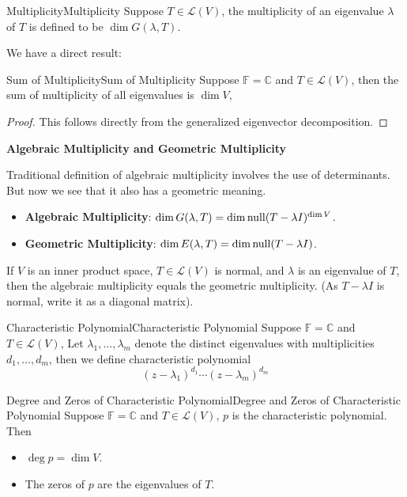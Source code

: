 \documentclass[../main.tex]{subfiles}
\begin{document}
\begin{definition}{Multiplicity}{Multiplicity}
Suppose $T\in \mathscr{L}(V)$, the multiplicity of an eigenvalue $\lambda$ of $T$ is defined to be $\dim G(\lambda,T)$.
\end{definition}

We have a direct result:
\begin{proposition}{Sum of Multiplicity}{Sum of Multiplicity}
Suppose $\mathbb{F}=\mathbb{C}$ and $T\in \mathscr{L}(V)$, then the sum of multiplicity of all eigenvalues is $\dim V$,
\end{proposition}
\begin{proof}
This follows directly from the generalized eigenvector decomposition.
\end{proof}

\begin{remark}
\textbf{Algebraic Multiplicity and Geometric Multiplicity}

Traditional definition of algebraic multiplicity involves the use of determinants. But now we see that it also has a geometric meaning.

\begin{itemize}
	\item \textbf{Algebraic Multiplicity}: $\dim G(\lambda, T) = \dim \operatorname{null} (T-\lambda I)^{\dim V}$.
	\item \textbf{Geometric Multiplicity}: $\dim E(\lambda, T) = \dim \operatorname{null} (T-\lambda I)$.
\end{itemize}

If $V$ is an inner product space, $T\in \mathscr{L}(V)$ is normal, and $\lambda$ is an eigenvalue of $T$, then the algebraic multiplicity equals the geometric multiplicity. (As $T-\lambda I$ is normal, write it as a diagonal matrix).
\end{remark}

\begin{definition}{Characteristic Polynomial}{Characteristic Polynomial}
Suppose $\mathbb{F}=\mathbb{C}$ and $T\in \mathscr{L}(V)$, Let $\lambda_1, \ldots ,\lambda_m$ denote the distinct eigenvalues with multiplicities $d_1, \ldots ,d_m$, then we define characteristic polynomial 
\begin{equation}
	(z-\lambda_1)^{d_1} \cdots (z-\lambda_m)^{d_m}
\end{equation}
\end{definition}

\begin{theorem}{Degree and Zeros of Characteristic Polynomial}{Degree and Zeros of Characteristic Polynomial}
Suppose $\mathbb{F}=\mathbb{C}$ and $T\in \mathscr{L}(V)$, $p$ is the characteristic polynomial. Then
\begin{itemize}
\item $\deg p = \dim V$.
\item The zeros of $p$ are the eigenvalues of $T$.
\end{itemize}
\end{theorem}
\end{document}
